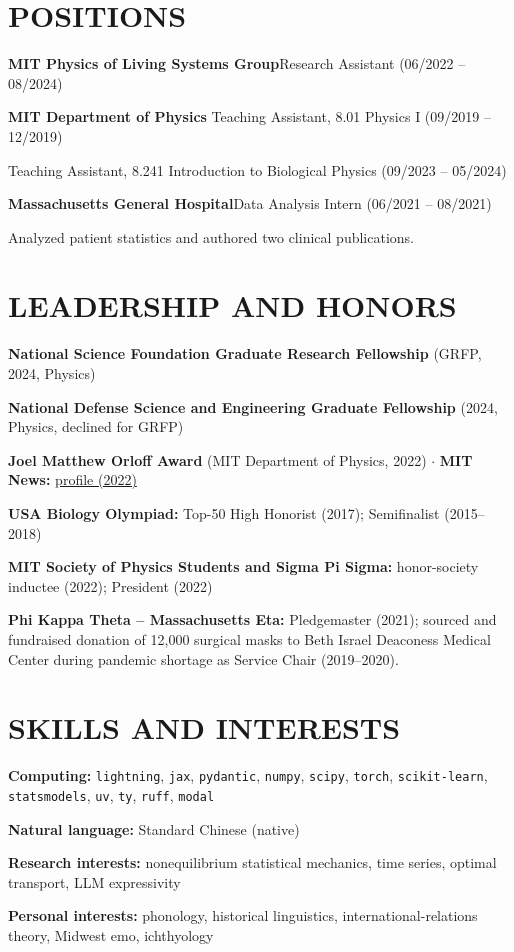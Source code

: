 \documentclass[11pt,letterpaper]{article}
\newcommand{\entry}[2]{\textbf{#1}\hfill #2\par}
\begin{document}
\section{POSITIONS}
\entry{MIT Physics of Living Systems Group}{Research Assistant (06/2022 -- 08/2024)}
\textbf{MIT Department of Physics} \hfill Teaching Assistant, 8.01 Physics I (09/2019 -- 12/2019)\par
\hfill Teaching Assistant, 8.241 Introduction to Biological Physics (09/2023 -- 05/2024)\par
\entry{Massachusetts General Hospital}{Data Analysis Intern (06/2021 -- 08/2021)}
Analyzed patient statistics and authored two clinical publications.\par

\section{LEADERSHIP AND HONORS}
\begingroup\setlength{\parskip}{1pt}
\textbf{National Science Foundation Graduate Research Fellowship} (GRFP, 2024, Physics)\par
\textbf{National Defense Science and Engineering Graduate Fellowship} (2024, Physics, declined for GRFP)\par
\textbf{Joel Matthew Orloff Award} (MIT Department of Physics, 2022) $\cdot$ \textbf{MIT News:} \href{https://news.mit.edu/2022/physics-gut-brain-health-chih-wei-joshua-liu-0603}{profile (2022)}\par
\textbf{USA Biology Olympiad:} Top-50 High Honorist (2017); Semifinalist (2015--2018)\par
\textbf{MIT Society of Physics Students and Sigma Pi Sigma:} honor-society inductee (2022); President (2022)\par
\textbf{Phi Kappa Theta -- Massachusetts Eta:} Pledgemaster (2021); sourced and fundraised donation of 12,000 surgical masks to Beth Israel Deaconess Medical Center during pandemic shortage as Service Chair (2019--2020).
\par\endgroup

\section{SKILLS AND INTERESTS}
\textbf{Computing:} \texttt{lightning}, \texttt{jax}, \texttt{pydantic}, \texttt{numpy}, \texttt{scipy}, \texttt{torch}, \texttt{scikit-learn}, \texttt{statsmodels}, \texttt{uv}, \texttt{ty}, \texttt{ruff}, \texttt{modal}\par
\textbf{Natural language:} Standard Chinese (native)\par
\textbf{Research interests:} nonequilibrium statistical mechanics, time series, optimal transport, LLM expressivity\par
\textbf{Personal interests:} phonology, historical linguistics, international-relations theory, Midwest emo, ichthyology
\end{document}
